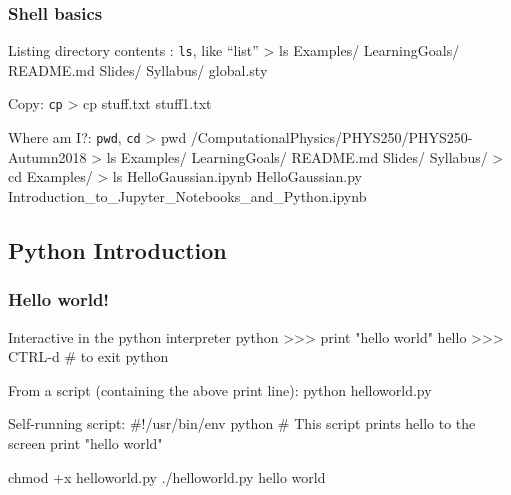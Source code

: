 \documentclass[hyperref={colorlinks=true}]{beamer}
\begin{document}

\begin{frame}[fragile]
  \frametitle{Shell basics}
  
  \begin{ucbashblock}{Listing directory contents : \texttt{ls}, like ``list''}
> ls
Examples/ LearningGoals/ README.md Slides/ 
Syllabus/ global.sty
  \end{ucbashblock}
  
  \begin{ucbashblock}{Copy: \texttt{cp}}
> cp stuff.txt stuff1.txt
  \end{ucbashblock}
  
  \begin{ucbashblock}{Where am I?: \texttt{pwd}, \texttt{cd}}
> pwd
/ComputationalPhysics/PHYS250/PHYS250-Autumn2018
> ls
Examples/ LearningGoals/ README.md Slides/ Syllabus/
> cd Examples/
> ls
HelloGaussian.ipynb
HelloGaussian.py
Introduction_to_Jupyter_Notebooks_and_Python.ipynb
  \end{ucbashblock}  
\end{frame}

\subsection[Python Introduction]{Python Introduction}

\begin{frame}[fragile]
  \frametitle{Hello world!}

  \begin{ucpythonblock}{Interactive in the python interpreter}
python
>>> print "hello world"
hello
>>> CTRL-d  # to exit python
  \end{ucpythonblock}
  
  \begin{ucpythonblock}{From a script (containing the above print line):}
python helloworld.py
  \end{ucpythonblock}
  
  \begin{ucpythonblock}{Self-running script:}
#!/usr/bin/env python
# This script prints hello to the screen
print "hello world"
  \end{ucpythonblock}
  
  \begin{ucpythonblock}{}
chmod +x helloworld.py
./helloworld.py
hello world
  \end{ucpythonblock}
  
\end{frame}
\end{document}
